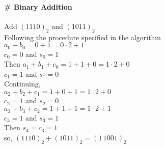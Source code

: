 \documentclass[../main-sheet.tex]{subfiles}
\begin{document}
\paragraph{\# Binary Addition} Add \((1110)_2\) and \((1011)_2\)\\
Following the procedure specified in the algorithm\\
\(a_0+b_0=0+1=0\cdot2+1\)\\
\(c_0=0\) and \(s_0=1\)\\
Then \(a_1+b_1+c_0=1+1+0=1\cdot2+0\)\\
\(c_1=1\) and \(s_1=0\)\\
Continuing,\\
\(a_2+b_2+c_1=1+0+1=1\cdot2+0\)\\
\(c_2=1\) and \(s_2=0\)\\
\(a_3+b_3+c_2=1+1+1=1\cdot2+1\)\\
\(c_3=1\) and \(s_3=1\)\\
Then \(s_4=c_3=1\)\\
so, \((1110)_2+(1011)_2=(1\,1001)_2\)
\end{document}
